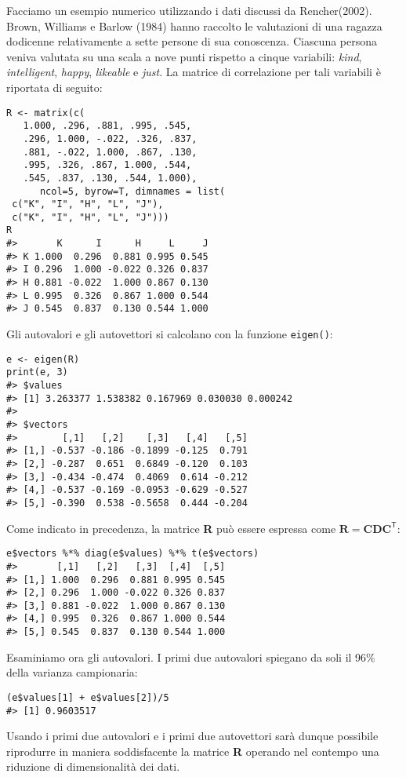 Facciamo un esempio numerico utilizzando i dati discussi da
    Rencher(2002).  
 Brown, Williams e Barlow (1984) hanno raccolto le valutazioni di
  una ragazza dodicenne relativamente a sette persone di sua
  conoscenza. 
  Ciascuna persona  veniva valutata su una scala a nove punti
  rispetto a cinque variabili: {\it kind}, {\it intelligent}, {\it
    happy}, {\it likeable} e {\it just}. 
  La matrice di correlazione per tali variabili è riportata di seguito:

\begin{lstlisting}
R <- matrix(c(
   1.000, .296, .881, .995, .545,
   .296, 1.000, -.022, .326, .837,
   .881, -.022, 1.000, .867, .130,
   .995, .326, .867, 1.000, .544,
   .545, .837, .130, .544, 1.000), 
      ncol=5, byrow=T, dimnames = list(
 c("K", "I", "H", "L", "J"),
 c("K", "I", "H", "L", "J")))
R
#>       K      I      H     L     J
#> K 1.000  0.296  0.881 0.995 0.545
#> I 0.296  1.000 -0.022 0.326 0.837
#> H 0.881 -0.022  1.000 0.867 0.130
#> L 0.995  0.326  0.867 1.000 0.544
#> J 0.545  0.837  0.130 0.544 1.000
\end{lstlisting}
Gli autovalori e gli autovettori si calcolano con la funzione {\tt eigen()}:
\medskip
\begin{lstlisting}
e <- eigen(R)
print(e, 3)
#> $values
#> [1] 3.263377 1.538382 0.167969 0.030030 0.000242
#> 
#> $vectors
#>        [,1]   [,2]    [,3]   [,4]   [,5]
#> [1,] -0.537 -0.186 -0.1899 -0.125  0.791
#> [2,] -0.287  0.651  0.6849 -0.120  0.103
#> [3,] -0.434 -0.474  0.4069  0.614 -0.212
#> [4,] -0.537 -0.169 -0.0953 -0.629 -0.527
#> [5,] -0.390  0.538 -0.5658  0.444 -0.204
\end{lstlisting}
Come indicato in precedenza, la matrice \textbf{R} può essere espressa come $\textbf{R} = \textbf{C}\textbf{D}\textbf{C}^{\ensuremath{\mathsf{T}}}$:
\medskip
\begin{lstlisting}
e$vectors %*% diag(e$values) %*% t(e$vectors)
#>       [,1]   [,2]   [,3]  [,4]  [,5]
#> [1,] 1.000  0.296  0.881 0.995 0.545
#> [2,] 0.296  1.000 -0.022 0.326 0.837
#> [3,] 0.881 -0.022  1.000 0.867 0.130
#> [4,] 0.995  0.326  0.867 1.000 0.544
#> [5,] 0.545  0.837  0.130 0.544 1.000
\end{lstlisting}
Esaminiamo ora gli autovalori.  I primi due autovalori spiegano da soli il 96\% della varianza campionaria: 
\medskip
\begin{lstlisting}
(e$values[1] + e$values[2])/5
#> [1] 0.9603517
\end{lstlisting}
Usando i primi due autovalori e i primi due autovettori sarà dunque
possibile riprodurre in maniera soddisfacente la matrice \textbf{R}
operando nel contempo una riduzione di dimensionalità dei dati. 


